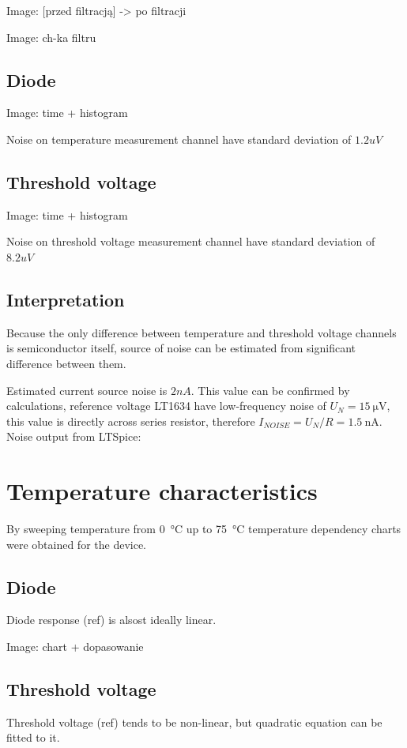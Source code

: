     Image: [przed filtracją] -> po filtracji

    Image: ch-ka filtru

    \subsection{Diode}
        Image: time + histogram

        Noise on temperature measurement channel have standard deviation of $1.2 uV$
    \subsection{Threshold voltage}
        Image: time + histogram

        Noise on threshold voltage measurement channel have standard deviation of $8.2 uV$

    \subsection{Interpretation}
        Because the only difference between temperature and threshold voltage channels is semiconductor itself, source of noise can be estimated from significant difference between them.

        Estimated current source noise is $2 nA$.
        This value can be confirmed by calculations, reference voltage LT1634 have low-frequency noise of $U_N = \SI{15}{\uV}$, this value is directly across series resistor, therefore $I_{NOISE} = U_N/R = \SI{1.5}{\nA}$. Noise output from LTSpice:



\section{Temperature characteristics}
    By sweeping temperature from \SI{0}{\degreeCelsius} up to \SI{75}{\degreeCelsius} temperature dependency charts were obtained for the device.

    \subsection{Diode}
        Diode response (ref) is alsost ideally linear.

        Image: chart + dopasowanie

    \subsection{Threshold voltage}
        Threshold voltage (ref) tends to be non-linear, but quadratic equation can be fitted to it.

